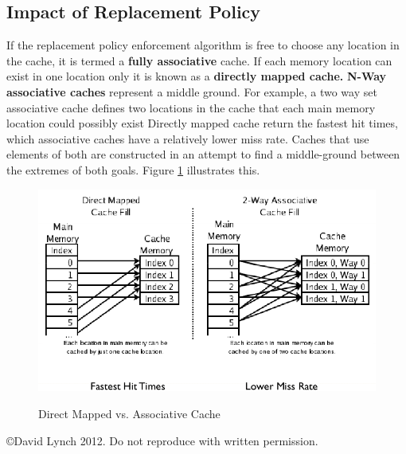 \documentclass[10pt,a4paper]{article}
\begin{document}
\subsection{Impact of Replacement Policy}
If the replacement policy enforcement algorithm is free to choose any location in the cache, it is termed a \textbf{fully associative} cache. If each memory location can exist in one location only it is known as a \textbf{directly mapped cache.} \textbf{N-Way associative caches} represent a middle ground. For example, a two way set associative cache defines two locations in the cache that each main memory location could possibly exist\newline\newline
Directly mapped cache return the fastest hit times, which associative caches have a relatively lower miss rate. Caches that use elements of both are constructed in an attempt to find a middle-ground between the extremes of both goals. Figure \ref{cache} illustrates this. 
\begin{figure}
\caption{Direct Mapped vs. Associative Cache \cite{CACHE}}
\begin{center}
\includegraphics[scale=0.45]{../images/cache.png}
\label{cache}
\end{center}
\end{figure}
{}

\begin{center}
{\small \copyright  David Lynch 2012. Do not reproduce with written permission.}
\end{center}
\end{document}
